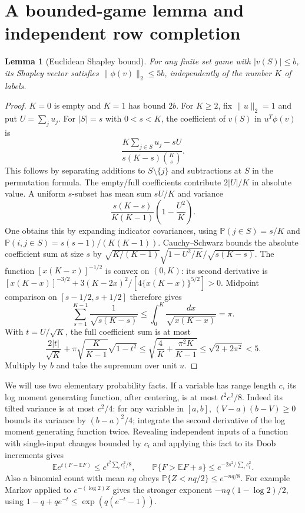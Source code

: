 \documentclass[11pt,a4paper]{article}
\numberwithin{equation}{section}
\newtheorem{lemma}[theorem]{Lemma}
\theoremstyle{definition}
\newcommand{\E}{\mathbb E}
\newcommand{\Prb}{\mathbb P}
\begin{document}
\section{A bounded-game lemma and independent row completion}\label{sec:tables}

\begin{lemma}[Euclidean Shapley bound]\label{lem:shapley}
For any finite set game with $|v(S)|\le b$, its Shapley vector satisfies
$\|\phi(v)\|_2\le5b$, independently of the number $K$ of labels.
\end{lemma}
\begin{proof}
$K=0$ is empty and $K=1$ has bound $2b$. For $K\ge2$, fix
$\|u\|_2=1$ and put $U=\sum_j u_j$. For $|S|=s$ with $0<s<K$,
the coefficient of $v(S)$ in $u^T\phi(v)$ is
\[
 \frac{K\sum_{j\in S}u_j-sU}{s(K-s)\binom K s}.
\]
This follows by separating additions to $S\setminus\{j\}$ and
subtractions at $S$ in the permutation formula. The empty/full
coefficients contribute $2|U|/K$ in absolute value. A uniform $s$-subset
has mean sum $sU/K$ and variance
\[
 \frac{s(K-s)}{K(K-1)}\left(1-\frac{U^2}K\right).
\]
One obtains this by expanding indicator covariances, using
$\Prb(j\in S)=s/K$ and $\Prb(i,j\in S)=s(s-1)/(K(K-1))$.
Cauchy--Schwarz bounds the absolute coefficient sum at size $s$ by
$\sqrt{K/(K-1)}\sqrt{1-U^2/K}/\sqrt{s(K-s)}$.
The function $[x(K-x)]^{-1/2}$ is convex on $(0,K)$: its second derivative
is $[x(K-x)]^{-3/2}+3(K-2x)^2/[4\{x(K-x)\}^{5/2}]>0$.
Midpoint comparison on $[s-1/2,s+1/2]$ therefore gives
\[
 \sum_{s=1}^{K-1}\frac1{\sqrt{s(K-s)}}
 \le\int_0^K\frac{dx}{\sqrt{x(K-x)}}=\pi.
\]
With $t=U/\sqrt K$, the full coefficient sum is at most
\[
 \frac{2|t|}{\sqrt K}+\pi\sqrt{\frac K{K-1}}\sqrt{1-t^2}
 \le\sqrt{\frac4K+\frac{\pi^2K}{K-1}}
 \le\sqrt{2+2\pi^2}<5.
\]
Multiply by $b$ and take the supremum over unit $u$.
\end{proof}

We will use two elementary probability facts. If a variable has range
length $c$, its log moment generating function, after centering, is at
most $t^2c^2/8$. Indeed its tilted variance is at most $c^2/4$:
for any variable in $[a,b]$, $(V-a)(b-V)\ge0$ bounds its variance by
$(b-a)^2/4$; integrate the second derivative of the log moment generating
function twice. Revealing independent inputs of a function with
single-input changes bounded by $c_i$ and applying this fact to its Doob
increments gives
\begin{equation}\label{eq:bd}
 \E e^{t(F-\E F)}\le e^{t^2\sum_i c_i^2/8},\qquad
 \Prb\{F>\E F+s\}\le e^{-2s^2/\sum_i c_i^2}.
\end{equation}
Also a binomial count with mean $nq$ obeys
$\Prb\{Z<nq/2\}\le e^{-nq/8}$. For example Markov applied to
$e^{-(\log2)Z}$ gives the stronger exponent
$-nq(1-\log2)/2$, using $1-q+qe^{-t}\le\exp(q(e^{-t}-1))$.
\end{document}
